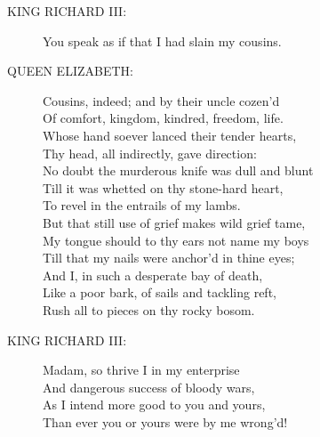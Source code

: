 \documentclass{article}
\begin{document}
\begin{description}
\item[KING RICHARD III:] 
\hspace{1pt}You speak as if that I had slain my cousins.\\
\end{description}
\begin{description}
\item[QUEEN ELIZABETH:] 
\hspace{1pt}Cousins, indeed; and by their uncle cozen'd\\
\hspace{1pt}Of comfort, kingdom, kindred, freedom, life.\\
\hspace{1pt}Whose hand soever lanced their tender hearts,\\
\hspace{1pt}Thy head, all indirectly, gave direction:\\
\hspace{1pt}No doubt the murderous knife was dull and blunt\\
\hspace{1pt}Till it was whetted on thy stone-hard heart,\\
\hspace{1pt}To revel in the entrails of my lambs.\\
\hspace{1pt}But that still use of grief makes wild grief tame,\\
\hspace{1pt}My tongue should to thy ears not name my boys\\
\hspace{1pt}Till that my nails were anchor'd in thine eyes;\\
\hspace{1pt}And I, in such a desperate bay of death,\\
\hspace{1pt}Like a poor bark, of sails and tackling reft,\\
\hspace{1pt}Rush all to pieces on thy rocky bosom.\\
\end{description}
\begin{description}
\item[KING RICHARD III:] 
\hspace{1pt}Madam, so thrive I in my enterprise\\
\hspace{1pt}And dangerous success of bloody wars,\\
\hspace{1pt}As I intend more good to you and yours,\\
\hspace{1pt}Than ever you or yours were by me wrong'd!\\
\end{description}
\end{document}
